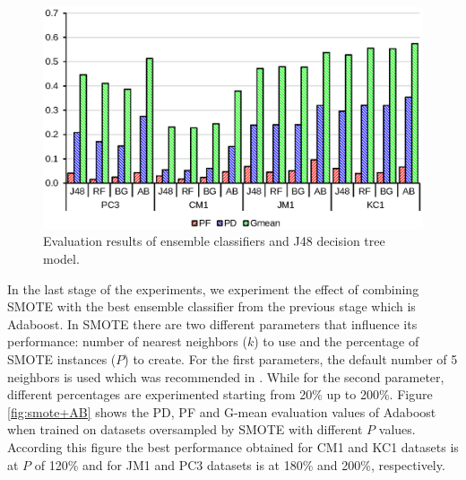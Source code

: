 \documentclass[runningheads,a4paper]{llncs}
\begin{document}
\begin{figure}[H]
\centering
\includegraphics[scale=0.6]{Ensembles.eps}
\caption{Evaluation results of ensemble classifiers and J48 decision tree model.}
\label{fig:ensembles}
\end{figure}


In the last stage of the experiments, we experiment the effect of combining SMOTE with the best ensemble classifier from the previous stage which is Adaboost. In SMOTE there are two different parameters that influence its performance: number of nearest neighbors ($k$) to use and the percentage of SMOTE instances ($P$) to create. For the first parameters, the default number of 5 neighbors is used which was recommended in \cite{chawla2002smote}. While for the second parameter, different percentages are experimented starting from 20\% up to 200\%. Figure \ref{fig:smote+AB} shows the PD, PF and G-mean evaluation values of Adaboost when trained on datasets oversampled by SMOTE with different $P$ values. According this figure the best performance obtained for CM1 and KC1 datasets is at $P$ of 120\% and for JM1 and PC3 datasets is at 180\% and 200\%, respectively.


 
\end{document}
